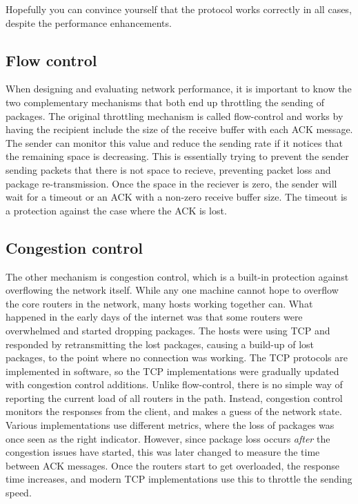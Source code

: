 Hopefully you can convince yourself that the protocol works correctly in all cases, despite the performance enhancements.

\subsection{Flow control}
When designing and evaluating network performance, it is important to know the two complementary mechanisms that both end up throttling the sending of packages. The original throttling mechanism is called flow-control and works by having the recipient include the size of the receive buffer with each ACK message. The sender can monitor this value and reduce the sending rate if it notices that the remaining space is decreasing. This is essentially trying to prevent the sender sending packets that there is not space to recieve, preventing packet loss and package re-transmission. Once the space in the reciever is zero, the sender will wait for a timeout or an ACK with a non-zero receive buffer size. The timeout is a protection against the case where the ACK is lost. 

\subsection{Congestion control}
The other mechanism is congestion control, which is a built-in protection against overflowing the network itself. While any one machine cannot hope to overflow the core routers in the network, many hosts working together can. What happened in the early days of the internet was that some routers were overwhelmed and started dropping packages. The hosts were using TCP and responded by retransmitting the lost packages, causing a build-up of lost packages, to the point where no connection was working. The TCP protocols are implemented in software, so the TCP implementations were gradually updated with congestion control additions. Unlike flow-control, there is no simple way of reporting the current load of all routers in the path. Instead, congestion control monitors the responses from the client, and makes a guess of the network state. Various implementations use different metrics, where the loss of packages was once seen as the right indicator. However, since package loss occurs \emph{after} the congestion issues have started, this was later changed to measure the time between ACK messages. Once the routers start to get overloaded, the response time increases, and modern TCP implementations use this to throttle the sending speed.

